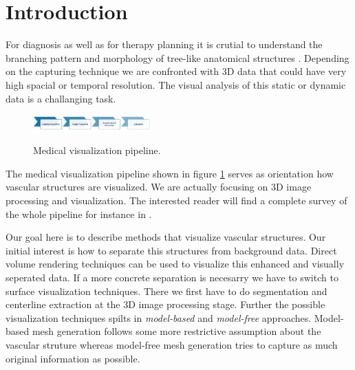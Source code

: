\section{Introduction}


For diagnosis as well as for therapy planning it is crutial to understand the branching pattern and morphology of tree-like anatomical structures \cite{preim2013visual}.
Depending on the capturing technique we are confronted with 3D data that could have very high spacial or temporal resolution. The visual analysis of this static or dynamic data is a challanging task.

\begin{figure}[h]
	\centering
	\includegraphics[width=0.4\textwidth]{./Images/MedicalVisualizationPipeline.png} \\
	\caption{Medical visualization pipeline.}
	\label{fig:MedicalVisualizationPipeline}
\end{figure}

The medical visualization pipeline shown in figure \ref{fig:MedicalVisualizationPipeline} serves as orientation how vascular structures are visualized. We are actually focusing on 3D image processing and visualization. The interested reader will find a complete survey of the whole pipeline for instance in \cite{preim2013visual}. 

Our goal here is to describe methods that visualize vascular structures. Our initial interest is how to separate this structures from background data. Direct volume rendering techniques can be used to visualize this enhanced and visually seperated data. If a more concrete separation is necesarry we have to switch to surface visualization techniques.
There we first have to do segmentation and centerline extraction at the 3D image processing stage. Further the possible visualization techniques spilts in \emph{model-based} and \emph{model-free} approaches. 
Model-based mesh generation follows some more restrictive assumption about the vascular struture whereas model-free mesh generation tries to capture as much original information as possible.



